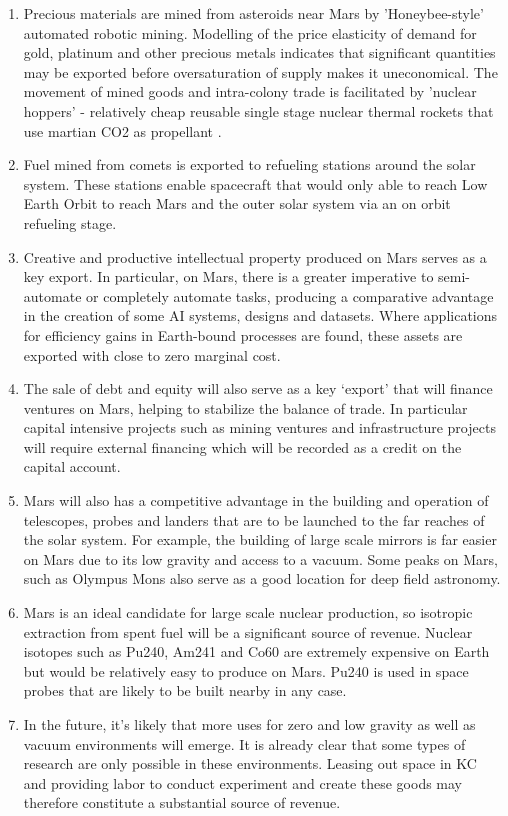 \documentclass[fleqn,10pt]{Stylesheet} %
\begin{document}
\begin{enumerate}
\item Precious materials are mined from asteroids near Mars by 'Honeybee-style' automated robotic mining. Modelling of the price elasticity of demand for gold, platinum and other precious metals indicates that significant quantities may be exported before oversaturation of supply makes it uneconomical. The movement of mined goods and intra-colony trade is facilitated by 'nuclear hoppers' - relatively cheap reusable single stage nuclear thermal rockets that use martian CO2 as propellant \cite{Zubrin2011}.
\item Fuel mined from comets is exported to refueling stations around the solar system. These stations enable spacecraft that would only able to reach Low Earth Orbit to reach Mars and the outer solar system via an on orbit refueling stage.
\item Creative and productive intellectual property produced on Mars serves as a key export. In particular, on Mars, there is a greater imperative to semi-automate or completely automate tasks, producing a comparative advantage in the creation of some AI systems, designs and datasets. Where applications for efficiency gains in Earth-bound processes are found, these assets are exported with close to zero marginal cost.
\item  The sale of debt and equity will also serve as a key ‘export’ that will finance ventures on Mars, helping to stabilize the balance of trade. In particular capital intensive projects such as mining ventures and infrastructure projects will require external financing which will be recorded as a credit on the capital account.
\item Mars will also has a competitive advantage in the building and operation of telescopes, probes and landers that are to be launched to the far reaches of the solar system. For example, the building of large scale mirrors is far easier on Mars due to its low gravity and access to a vacuum. Some peaks on Mars, such as Olympus Mons also serve as a good location for deep field astronomy.
\item Mars is an ideal candidate for large scale nuclear production, so isotropic extraction from spent fuel will be a significant source of revenue. Nuclear isotopes such as Pu240, Am241 and Co60 are extremely expensive on Earth but would be relatively easy to produce on Mars. Pu240 is used in space probes that are likely to be built nearby in any case.
\item In the future, it’s likely that more uses for zero and low gravity as well as vacuum environments will emerge. It is already clear that some types of research are only possible in these environments. Leasing out space in KC and providing labor to conduct experiment and create these goods may therefore constitute a substantial source of revenue. 
\end{enumerate}
\end{document}
